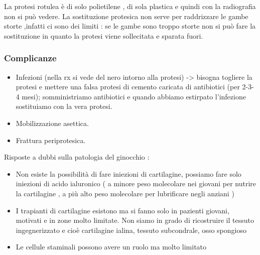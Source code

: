 La protesi rotulea è di solo polietilene , di sola plastica e quindi con la radiografia non si può vedere. La sostituzione protesica non serve per raddrizzare le gambe storte ,infatti ci sono dei limiti : se le gambe sono troppo storte non si può fare la sostituzione in quanto la protesi viene sollecitata e sparata fuori.

\subsubsection{Complicanze}

\begin{itemize}
\item
  Infezioni (nella rx si vede del nero intorno alla protesi) -> bisogna togliere la protesi e mettere una falsa protesi di cemento caricata di antibiotici (per 2-3-4 mesi); somministriamo antibiotici e quando abbiamo estirpato l'infezione sostituiamo con la vera protesi.
\item
  Mobilizzazione asettica.
\item
  Frattura periprotesica.
\end{itemize}

Risposte a dubbi sulla patologia del ginocchio :

\begin{itemize}
\item
  Non esiste la possibilità di fare iniezioni di cartilagine, possiamo fare solo iniezioni di acido ialuronico ( a minore peso molecolare nei giovani per nutrire la cartilagine , a più alto peso molecolare per lubrificare negli anziani )
\item
  I trapianti di cartilagine esistono ma si fanno solo in pazienti giovani, motivati e in zone molto limitate. Non siamo in grado di ricostruire il tessuto ingegnerizzato e cioè cartilagine ialina, tessuto subcondrale, osso spongioso
\item
  Le cellule staminali possono avere un ruolo ma molto limitato
\end{itemize}
